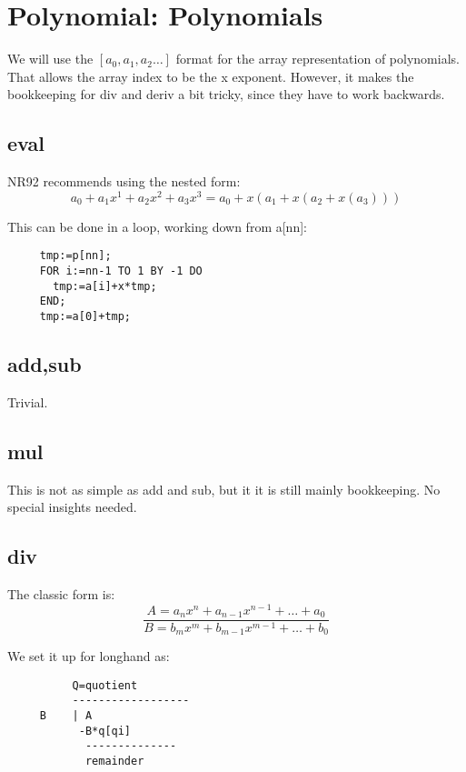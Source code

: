 \section{Polynomial: Polynomials}
We will use the $[a_0,a_1,a_2 \dots]$ format for the array
representation of polynomials.  That allows the array index
to be the x exponent.  However, it makes the bookkeeping for
div and deriv a bit tricky, since they have to work
backwards.

\subsection*{eval}
NR92 recommends using the nested form:
\begin{equation}
    a_0 + a_1 x^1 + a_2 x^2 + a_3 x^3
      = a_0+ x(a_1+x(a_2+x(a_3)))
\end{equation}

This can be done in a loop, working down from a[nn]:
\begin{tt} \begin{verbatim}
     tmp:=p[nn];
     FOR i:=nn-1 TO 1 BY -1 DO
       tmp:=a[i]+x*tmp;
     END;
     tmp:=a[0]+tmp;
\end{verbatim}  \end{tt}
   
\subsection*{add,sub}
Trivial.

\subsection*{mul}
This is not as simple as add and sub, but it it is still
mainly bookkeeping.  No special insights needed.

\subsection*{div}
The classic form is:
\begin{equation}
   \frac{A=a_n x^n+a_{n-1} x^{n-1}+\dots+a_0}
     {B=b_m x^m+b_{m-1} x^{m-1}+\dots+b_0}
\end{equation}

We set it up for longhand as:
\begin{tt} \begin{verbatim}
          Q=quotient
          ------------------
     B    | A
           -B*q[qi]
            --------------
            remainder
\end{verbatim} \end{tt}

